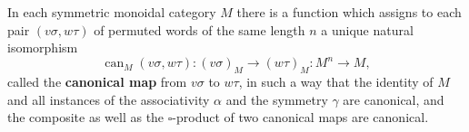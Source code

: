In each symmetric monoidal category $M$ there is a function which assigns to each pair $(v\sigma, w\tau)$ of permuted words of the same length $n$ a unique natural isomorphism
$$\operatorname{can}_M(v\sigma, w\tau) : (v\sigma)_M \rightarrow (w\tau)_M : M^n \rightarrow M,$$
called the \textbf{canonical map} from $v\sigma$ to $w\tau$, in such a way that the identity of $M$ and all instances of the associativity $\alpha$ and the symmetry $\gamma$ are canonical, and the composite as well as the $\square$-product of two canonical maps are canonical.
